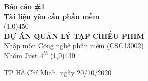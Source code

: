 \documentclass[a4paper, 12pt]{article}
\begin{document}
    \begin{titlepage}
        \begin{center}

            \vspace*{1cm}
            \Large\textbf{Báo cáo \#1\\Tài liệu yêu cầu phần mềm}\\

            \vfill
            \line(1,0){450}\\[4mm]
            \LARGE\textbf{\MakeUppercase{Dự án quản lý tạp chiếu phim}}\\[3mm]
            \Large{Nhập môn Công nghệ phần mềm (CSC13002)}\\[3mm]
            \Large{Nhóm Just $4^{th}$}
            \line(1,0){430}\\
            \vfill

            \vfill
            TP Hồ Chí Minh, ngày 20/10/2020
        \end{center}
    \end{titlepage}

    \tableofcontents
    \thispagestyle{empty}
    \clearpage
\end{document}
